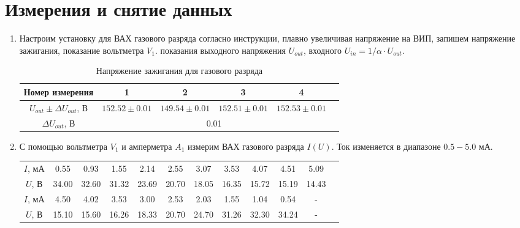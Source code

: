 \documentclass[a4paper, 12pt]{article}
\begin{document}
\section*{Измерения и снятие данных}
\begin{enumerate}
    \item Настроим установку для ВАХ газового разряда согласно инструкции, плавно увеличивая напряжение на ВИП, запишем напряжение
    зажигания, показание вольтметра $V_{1}$. показания выходного напряжения $U_{out}$, входного $U_{in} = 1/\alpha \cdot U_{out}$.
    \begin{table}[htbp]
        \centering
        \begin{tabular}{|c|c|c|c|c|c|}
            \hline
            Номер измерения & 1 & 2 & 3 & 4\\
            \hline
            $U_{out}\pm \Delta U_{out}$, В & $152.52\pm 0.01$ & $149.54\pm 0.01$ & $152.51\pm 0.01$ & $152.53\pm 0.01$\\
            \hline
            $\Delta U_{out}$, В & \multicolumn{4}{|c|}{0.01}\\
            \hline
        \end{tabular}
        \caption{Напряжение зажигания для газового разряда}
        \label{Напряжение зажигания для газового разряда}
    \end{table}
    \item С помощью вольтметра $V_{1}$ и амперметра $A_{1}$ измерим ВАХ газового разряда $I(U)$. Ток изменяется в диапазоне $0.5 - 5.0$ мА.
    \begin{table}[htbp]
        \centering
        \begin{tabular}{|c|c|c|c|c|c|c|c|c|c|c|c|}
            \hline
            $I$, мА & 0.55 & 0.93 & 1.55 & 2.14 & 2.55 & 3.07 & 3.53 & 4.07 & 4.51 & 5.09\\
            $U$, В & 34.00 & 32.60 & 31.32 & 23.69 & 20.70 & 18.05 & 16.35 & 15.72 & 15.19 & 14.43\\
            \hline
            $I$, мА & 4.50 & 4.02 & 3.53 & 3.00 & 2.53 & 2.03 & 1.55 & 1.04 & 0.54 & -\\
            $U$, В & 15.10 & 15.60 & 16.26 & 18.33 & 20.70 & 24.70 & 31.26 & 32.30 & 34.24 & -\\
            \hline
        \end{tabular}

\end{table}
\end{enumerate}
\end{document}
